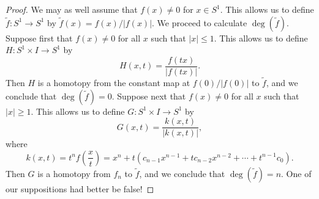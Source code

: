 \begin{proof}
We may as well assume that $f(x)\neq0$ for $x\in S^1$. This allows us to define $\widetilde{f}:S^1\to S^1$ by $\widetilde{f}(x)=f(x)/|f(x)|$. We proceed to calculate $\deg(\widetilde{f})$. Suppose first that $f(x)\neq0$ for all $x$ such that $|x|\leq1$. This allows us to define $H:S^1\times I\to S^1$ by 
\[H(x,t)=\dfrac{f(tx)}{|f(tx)|}.\]
Then $H$ is a homotopy from the constant map at $f(0)/|f(0)|$ to $\widetilde{f}$, and we conclude that $\deg(\widetilde{f})=0$. Suppose next that $f(x)\neq0$ for all $x$ such that $|x|\geq 1$. This allows us to define $G:S^1\times I\to S^1$ by 
\[G(x,t)=\dfrac{k(x,t)}{|k(x,t)|},\]
where
\[k(x,t)=t^nf(\dfrac{x}{t})=x^n+t(c_{n-1}x^{n-1}+tc_{n-2}x^{n-2}+\cdots+t^{n-1}c_0).\]
Then $G$ is a homotopy from $f_n$ to $\widetilde{f}$, and we conclude that $\deg(\widetilde{f})=n$. One of our suppositions had better be false!
\end{proof}
